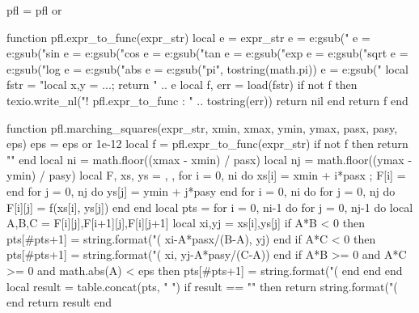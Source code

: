 \begin{luacode*}
pfl = pfl or {}

function pfl.expr_to_func(expr_str)
    local e = expr_str
    e = e:gsub("%
    e = e:gsub("sin%
    e = e:gsub("cos%
    e = e:gsub("tan%
    e = e:gsub("exp%
    e = e:gsub("sqrt%
    e = e:gsub("log%
    e = e:gsub("abs%
    e = e:gsub("pi",    tostring(math.pi))
    e = e:gsub("%
    local fstr = "local x,y = ...; return " .. e
    local f, err = load(fstr)
    if not f then
        texio.write_nl("! pfl.expr_to_func : " .. tostring(err))
        return nil
    end
    return f
end

function pfl.marching_squares(expr_str, xmin, xmax, ymin, ymax, pasx, pasy, eps)
    eps = eps or 1e-12
    local f = pfl.expr_to_func(expr_str)
    if not f then return "" end
    local ni = math.floor((xmax - xmin) / pasx)
    local nj = math.floor((ymax - ymin) / pasy)
    local F, xs, ys = {}, {}, {}
    for i = 0, ni do xs[i] = xmin + i*pasx ; F[i] = {} end
    for j = 0, nj do ys[j] = ymin + j*pasy end
    for i = 0, ni do
        for j = 0, nj do F[i][j] = f(xs[i], ys[j]) end
    end
    local pts = {}
    for i = 0, ni-1 do
        for j = 0, nj-1 do
            local A,B,C = F[i][j],F[i+1][j],F[i][j+1]
            local xi,yj = xs[i],ys[j]
            if A*B < 0 then
                pts[#pts+1] = string.format("(%
                    xi-A*pasx/(B-A), yj)
            end
            if A*C < 0 then
                pts[#pts+1] = string.format("(%
                    xi, yj-A*pasy/(C-A))
            end
            if A*B >= 0 and A*C >= 0 and math.abs(A) < eps then
                pts[#pts+1] = string.format("(%
            end
        end
    end
    local result = table.concat(pts, " ")
    if result == "" then
        return string.format("(%
    end
    return result
end


\end{luacode*}
